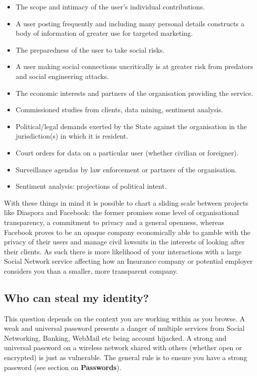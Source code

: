\begin{itemize}
\item
  The scope and intimacy of the user's individual contributions.
\item
  A user posting frequently and including many personal details
  constructs a body of information of greater use for targeted
  marketing.
\item
  The preparedness of the user to take social risks.
\item
  A user making social connections uncritically is at greater risk from
  predators and social engineering attacks.
\item
  The economic interests and partners of the organisation providing the
  service.
\item
  Commissioned studies from clients, data mining, sentiment analysis.
\item
  Political/legal demands exerted by the State against the organisation
  in the jurisdiction(s) in which it is resident.
\item
  Court orders for data on a particular user (whether civilian or
  foreigner).
\item
  Surveillance agendas by law enforcement or partners of the
  organisation.
\item
  Sentiment analysis: projections of political intent.
\end{itemize}
With these things in mind it is possible to chart a sliding scale
between projects like Diaspora and Facebook: the former promises some
level of organisational transparency, a commitment to privacy and a
general openness, whereas Facebook proves to be an opaque company
economically able to gamble with the privacy of their users and manage
civil lawsuits in the interests of looking after their clients. As such
there is more likelihood of your interactions with a large Social
Network service affecting how an Insurance company or potential employer
considers you than a smaller, more transparent company.

\subsection{Who can steal my identity?}

This question depends on the context you are working within as you
browse. A weak and universal password presents a danger of multiple
services from Social Networking, Banking, WebMail etc being account
hijacked. A strong and universal password on a wireless network shared
with others (whether open or encrypted) is just as vulnerable. The
general rule is to ensure you have a strong password (see section on
\textbf{Passwords}).

